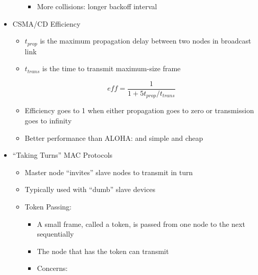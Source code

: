 \begin{itemize}
\begin{itemize}
\begin{itemize}
          \item More collisions: longer backoff interval

        \end{itemize}

    \end{itemize}

  \item CSMA/CD Efficiency

    \begin{itemize}

      \item $t_{prop}$ is the maximum propagation delay between two nodes in broadcast link

      \item $t_{trans}$ is the time to transmit maximum-size frame

        $$eff=\frac{1}{1+5t_{prop}/t_{trans}}$$

      \item Efficiency goes to 1 when either propagation goes to zero or transmission goes to infinity

      \item Better performance than ALOHA: and simple and cheap

    \end{itemize}

  \item ``Taking Turns'' MAC Protocols

    \begin{itemize}

      \item Master node ``invites'' slave nodes to transmit in turn

      \item Typically used with ``dumb'' slave devices

      \item Token Passing:

        \begin{itemize}

          \item A small frame, called a token, is passed from one node to the next sequentially

          \item The node that has the token can transmit

          \item Concerns:

            \begin{itemize}


\end{itemize}
\end{itemize}
\end{itemize}
\end{itemize}
